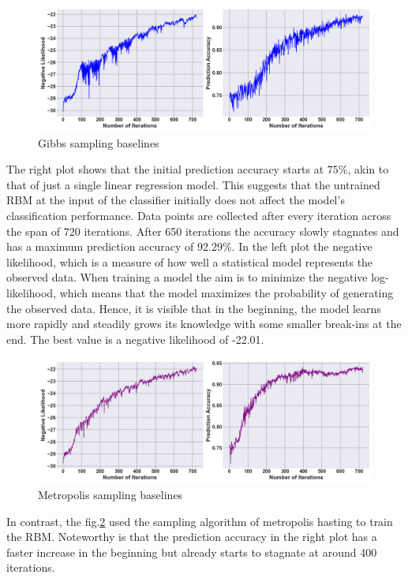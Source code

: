 \begin{figure}[H]
    \centering
    \includegraphics[width=0.9\linewidth]{graphics/CD_combined_plot.png}
    \caption{Gibbs sampling baselines}
    \label{CD_baselines}
\end{figure}
The right plot shows that the initial prediction accuracy starts at 75\%, akin to that of just a single linear regression model.
This suggests that the untrained \ac{RBM} at the input of the classifier initially does not affect the model's classification performance.
Data points are collected after every iteration across the span of 720 iterations. 
After 650 iterations the accuracy slowly stagnates and has a maximum prediction accuracy
of 92.29\%. 
In the left plot the negative likelihood, which is a measure of how well a statistical model represents the observed data.
When training a model the aim is to minimize the negative log-likelihood, which means that the model maximizes the probability of generating the observed data.
Hence, it is visible that in the beginning, the model learns more rapidly and steadily grows its knowledge with some smaller break-ins at the end.
The best value is a negative likelihood of -22.01.
\begin{figure}[H]
    \centering
    \includegraphics[width=0.9\linewidth]{graphics/metropolis_combined_plot.png}
    \caption{Metropolis sampling baselines}
    \label{metropolis_baselines}
\end{figure}
In contrast, the fig.\ref{metropolis_baselines} used the sampling algorithm of metropolis hasting to train the \ac{RBM}.
Noteworthy is that the prediction accuracy in the right plot has a faster increase in the beginning but already starts to stagnate at around 400 iterations. 
